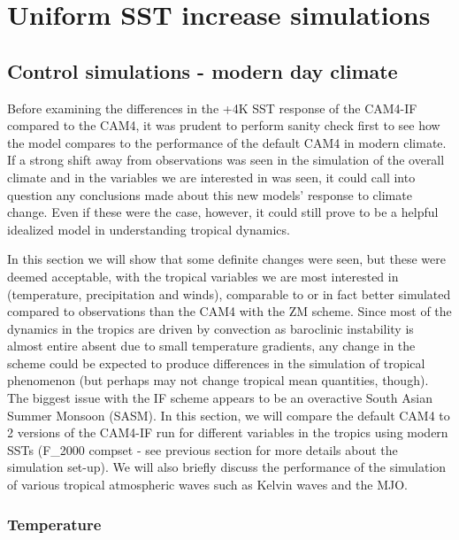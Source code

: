 \documentclass[letterpaper,12pt,titlepage,oneside,final]{book}
\begin{document}
\chapter{Uniform SST increase simulations}
\section{Control simulations - modern day climate}
Before examining the differences in the +4K SST response of the CAM4-IF compared to the CAM4, it was prudent to perform sanity check first to see how the model compares to the performance of the default CAM4 in modern climate. If a strong shift away from observations was seen in the simulation of the overall climate and in the variables we are interested in was seen, it could call into question any conclusions made about this new models' response to climate change. Even if these were the case, however, it could still prove to be a helpful idealized model in understanding tropical dynamics. 

In this section we will show that some definite changes were seen, but these were deemed acceptable, with the tropical variables we are most interested in (temperature, precipitation and winds), comparable to or in fact better simulated compared to observations than the CAM4 with the ZM scheme. Since most of the dynamics in the tropics are driven by convection as baroclinic instability is almost entire absent due to small temperature gradients, any change in the scheme could be expected to produce differences in the simulation of tropical phenomenon (but perhaps may not change tropical mean quantities, though). The biggest issue with the IF scheme appears to be an overactive South Asian Summer Monsoon (SASM). In this section, we will compare the default CAM4 to 2 versions of the CAM4-IF run for different variables in the tropics using modern SSTs (F\_2000 compset - see previous section for more details about the simulation set-up). We will also briefly discuss the performance of the simulation of various tropical atmospheric waves such as Kelvin waves and the MJO. 

\subsection{Temperature}
\end{document}
